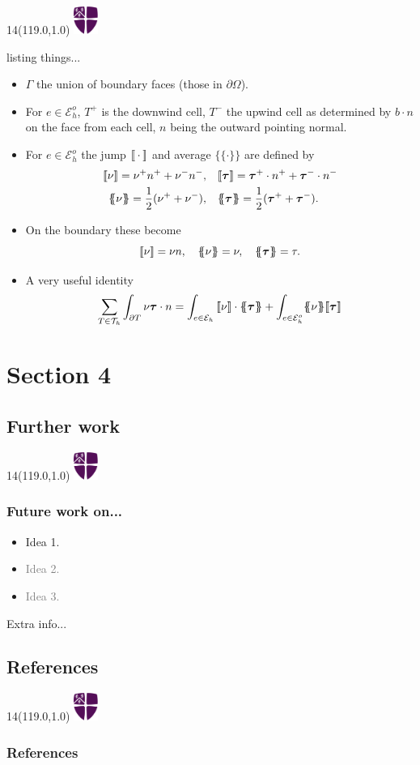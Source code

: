 \documentclass[xcolor=dvipsnames,usepdftitle=false]{beamer}
\newcommand{\MyLogo}{%
	\begin{textblock}{14}(119.0,1.0) %
		\includegraphics[width=0.8cm]{pictures/logo_only.eps}
	\end{textblock}
}
\newcommand{\ldb}{\text{\textlbrackdbl}}
\newcommand{\rdb}{\text{\textrbrackdbl}}
\newcommand{\Average}[1]{\ensuremath{\{ \! \! \{ #1 \} \! \! \}} }
\newcommand{\average}[1]{\ensuremath{\{ \! \! \{ #1 \} \! \! \}} }
\newcommand{\jump}[1]{\ensuremath{\ldb #1 \rdb}}
\newcommand{\pO}{{\partial \Omega}}
\newcommand{\Th}[0]{{\ensuremath{\mathcal{T}_h}}}
\newcommand{\TinT}[0]{{\ensuremath{T \in \Th}}}
\newcommand{\Eho}[0]{\ensuremath{{\mathcal{E}_h^o}}}
\newcommand{\Eh}[0]{\ensuremath{{\mathcal{E}_h}}}
\newcommand{\vectau}[0]{\ensuremath{\boldsymbol{\tau}}}
\newcommand{\half}[0]{\ensuremath{\frac{1}{2}}}
\begin{document}
\begin{frame}
	\MyLogo
	listing things...
	\begin{itemize}
		\item $\Gamma$ the union of boundary faces (those in $\pO$).
		\item For $e \in \Eho$, $T^+$ is the downwind cell, $T^-$ the upwind cell as determined by $b \cdot n$ on the face from each cell, $n$ being the outward pointing normal.
		\item For $e \in \Eho$ the jump $\jump{\cdot}$ and average $\average{\cdot}$ are defined by
			\begin{equation}
				\begin{split}
					\jump{\nu} = \nu^+ n^+ + \nu^- n^-, &\quad \jump{\vectau} = \vectau^+ \cdot n^+ + \vectau^- \cdot n^- \nonumber \\
					\average{\nu} = \half (\nu^+ + \nu^-), &\quad \Average{\vectau} = \frac{1}{2} (\vectau^+ + \vectau^-). \nonumber
				\end{split}
			\end{equation}
		\item On the boundary these become
			\begin{equation}
				\jump{\nu} = \nu n, \quad \average{\nu} = \nu, \quad \average{\vectau} = \tau. \nonumber
			\end{equation}
		\item A very useful identity
			\begin{equation}
				\sum_{\TinT} \int_{\partial T} \nu \vectau \cdot n = \int_{e\in \Eh} \jump{\nu} \cdot \average{\vectau} + \int_{e\in \Eho} \average{\nu} \jump{\vectau} \nonumber
			\end{equation}
	\end{itemize}
\end{frame}


\section{Section 4}


\subsection*{Further work}

\begin{frame}
	\MyLogo
	\frametitle{Future work on...}
	\begin{itemize}
		\item Idea 1.
		\item \textcolor{Gray}{Idea 2.}
		\item \textcolor{Gray}{Idea 3.}
	\end{itemize}
	
	Extra info...
\end{frame}

\subsection*{References}

\begin{frame}
	\MyLogo
	\frametitle{References}
	\tiny{
	
	} %
\end{frame}
\end{document}
